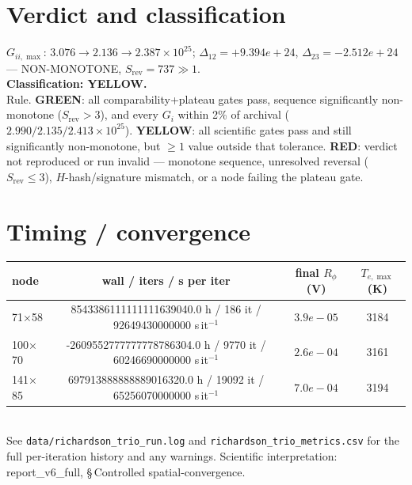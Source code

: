 \documentclass[11pt]{article}
\begin{document}
\section*{Verdict and classification}
$G_{ii,\max}$: $3.076 \to 2.136 \to 2.387 \times10^{25}$; $\Delta_{12}=+9.394e+24$, $\Delta_{23}=-2.512e+24$ --- NON-MONOTONE, $S_{\mathrm{rev}}=737\gg1$.\\[3pt]
\textbf{Classification: YELLOW.}\\[2pt]
{\footnotesize Rule. \textbf{GREEN}: all comparability+plateau gates pass, sequence significantly
non-monotone ($S_{\mathrm{rev}}>3$), and every $G_i$ within 2\% of archival
($2.990/2.135/2.413\times10^{25}$). \textbf{YELLOW}: all scientific gates pass and still significantly
non-monotone, but $\ge1$ value outside that tolerance. \textbf{RED}: verdict not reproduced or run
invalid --- monotone sequence, unresolved reversal ($S_{\mathrm{rev}}\le3$), $H$-hash/signature
mismatch, or a node failing the plateau gate.}
\section*{Timing / convergence}
\begin{tabular}{lccc}\toprule
node & wall / iters / s per iter & final $R_\phi$ (V) & $T_{e,\max}$ (K) \\ \midrule
71$\times$58 & 8543386111111111639040.0 h / 186 it / 92649430000000 s\,it$^{-1}$ & $3.9e-05$ & 3184 \\
100$\times$70 & -2609552777777778786304.0 h / 9770 it / 60246690000000 s\,it$^{-1}$ & $2.6e-04$ & 3161 \\
141$\times$85 & 697913888888889016320.0 h / 19092 it / 65256070000000 s\,it$^{-1}$ & $7.0e-04$ & 3194 \\
\bottomrule\end{tabular}\\[4pt]
See \texttt{data/richardson\_trio\_run.log} and \texttt{richardson\_trio\_metrics.csv} for the full
per-iteration history and any warnings. Scientific interpretation: report\_v6\_full, \S\,Controlled
spatial-convergence.
\end{document}

